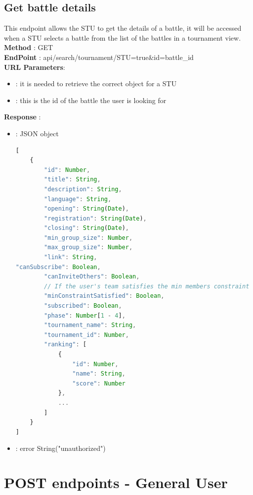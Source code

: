 \subsection*{Get battle details}
This endpoint allows the STU to get the details of a battle, it will be accessed when a STU selects a battle from the list of the battles in a tournament view.\\
\textbf{Method} : GET \\
\textbf{EndPoint} : api/search/tournament/STU=true\&id=battle\_id\\
\textbf{URL Parameters}:
\begin{itemize}
    \item {} : it is needed to retrieve the correct object for a STU
    \item {} : this is the id of the battle the user is looking for
\end{itemize}
\textbf{Response} : 
    \begin{itemize}
        \item {} : JSON object
        \begin{lstlisting}[language=JavaScript, label={lst:jscode}, basicstyle=\ttfamily]
[
    {
        "id": Number,
        "title": String,
        "description": String,
        "language": String,
        "opening": String(Date),
        "registration": String(Date),
        "closing": String(Date),
        "min_group_size": Number,
        "max_group_size": Number,
        "link": String,
"canSubscribe": Boolean,
        "canInviteOthers": Boolean,
        // If the user's team satisfies the min members constraint
        "minConstraintSatisfied": Boolean,
        "subscribed": Boolean,
        "phase": Number[1 - 4],
        "tournament_name": String,
        "tournament_id": Number,
        "ranking": [
            {
                "id": Number,
                "name": String,
                "score": Number
            },
            ...
        ]
    }
]
        \end{lstlisting} 
        \item {} : error String("unauthorized")
    \end{itemize}

\section*{POST endpoints - General User}
